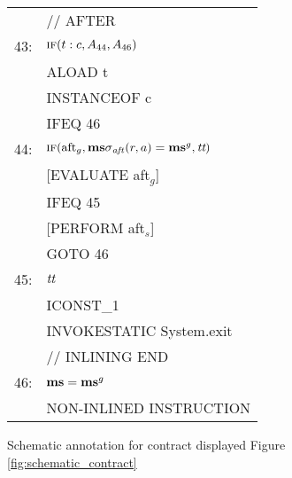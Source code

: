 \documentclass[10pt,twocolumn]{article}
\newcommand{\IF}{\mbox{\sc if}}
\newcommand{\MS}{{\bf ms}}
\newcommand{\True}{\mbox{\it tt}}
\begin{document}
\begin{figure}
{\begin{center}
\begin{tabular}{@{}l@{~}l@{}}
        & // AFTER \\[\sep]

43:     & $\IF(t:c, A_{44}, A_{46})$ \\
        & ALOAD t \\
        & INSTANCEOF c \\
        & IFEQ 46 \\[\sep]

44:     & $\IF(\mbox{aft}_g, \MS\sigma_{\it aft}(r, a) = \MS^g, \True)$ \\
        & [EVALUATE aft$_g$] \\
        & IFEQ 45 \\
        & [PERFORM aft$_s$] \\
        & GOTO 46 \\[\sep]
        
45:     & $\True$ \\
        & ICONST\_1 \\
        & INVOKESTATIC System.exit\\[\sep]
        
        & // INLINING END \\[\sep]
        
46:     & $\MS = \MS^g$ \\
        & NON-INLINED INSTRUCTION
\end{tabular}
\end{center}
}
\caption{\label{fig:schematic_annotations} Schematic annotation for contract displayed Figure \ref{fig:schematic_contract}}
\end{figure}
\end{document}

